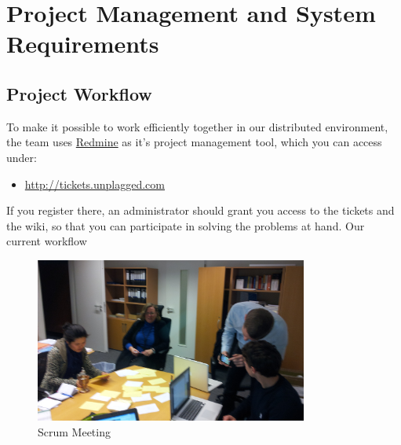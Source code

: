 \chapter{Project Management and System Requirements}\label{chap:systemRequirements}

\section{Project Workflow}\label{sec:workflow}

To make it possible to work efficiently together in our distributed environment, the team uses 
\href{http://www.redmine.org/}{Redmine} as it's project management tool, which you can access under:

\begin{itemize}
\item \url{http://tickets.unplagged.com}
\end{itemize}

If you register there, an administrator should grant you access to the tickets and the wiki, so that you can participate
in solving the problems at hand. Our current workflow 



\begin{figure}[!h]
    \includegraphics[width=0.8\textwidth]{images/2011-11-15-user-stories-6.jpg}
  \caption{Scrum Meeting}
  \label{fig:scrumming}
\end{figure}

